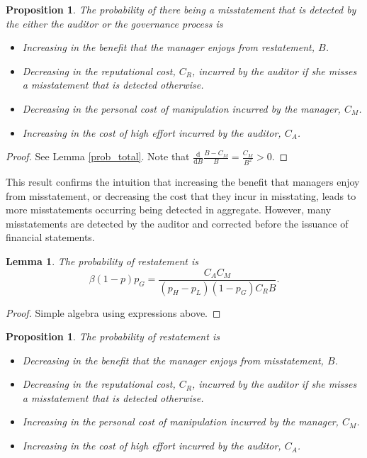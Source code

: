 \documentclass[11pt]{amsart}
\newtheorem{lemma}{Lemma}
\newtheorem{proposition}[theorem]{Proposition}
\begin{document}
\begin{proposition}
The probability of there being a misstatement that is detected by the either the auditor or the governance process is 
\begin{itemize}
\item Increasing in the benefit that the manager enjoys from restatement, $B$.
\item Decreasing in the reputational cost, $C_R$, incurred by the auditor if she misses a misstatement that is detected otherwise.
\item Decreasing in the personal cost of manipulation incurred by the manager, $C_M$.
\item Increasing in the cost of high effort incurred by the auditor, $C_A$.
\end{itemize}
\end{proposition}

\begin{proof}
See Lemma \ref{prob_total}. 
Note that $\frac{\mathrm{d}}{\mathrm{d}B} \frac{B- C_M}{B} = \frac{C_M}{B^2} >0.$
\end{proof}

This result confirms the intuition that increasing the benefit that managers enjoy from misstatement, or decreasing the cost that they incur in misstating, leads to more misstatements occurring being detected in aggregate. However, many misstatements are detected by the auditor and corrected before the issuance of financial statements.

\begin{lemma}\label{prob_observed}
The probability of restatement is 
\[ \beta  (1-p)  p_G = \frac{C_A C_M}{(p_H-p_L) (1 - p_G) C_R  B}. \]
\end{lemma}
\begin{proof}
Simple algebra using expressions above.
\end{proof}

\begin{proposition}\label{cool_result}
The probability of restatement is 
\begin{itemize}
\item Decreasing in the benefit that the manager enjoys from misstatement, $B$.
\item Decreasing in the reputational cost, $C_R$, incurred by the auditor if she misses a misstatement that is detected otherwise.
\item Increasing in the personal cost of manipulation incurred by the manager, $C_M$.
\item Increasing in the cost of high effort incurred by the auditor, $C_A$.
\end{itemize}
\end{proposition}
\end{document}

